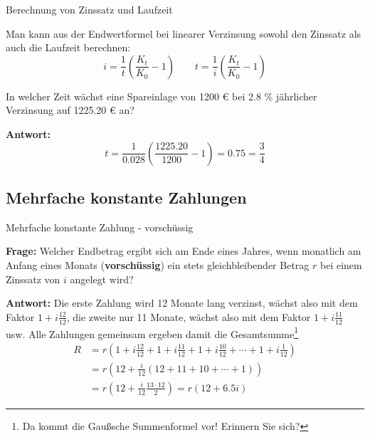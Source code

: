 \begin{frame}{Berechnung von Zinssatz und Laufzeit}
	\begin{bemerkung}
		Man kann aus der Endwertformel bei linearer Verzinsung sowohl den Zinssatz als auch die Laufzeit berechnen:
		\[
		i = \frac{1}{t} \left( \frac{K_{t}}{K_{0}} - 1\right) \qquad t = \frac{1}{i} \left( \frac{K_{t}}{K_{0}} - 1\right)
		\]
	\end{bemerkung}
	\begin{example}
		In welcher Zeit wächst eine Spareinlage von 1200 € bei 2.8 \% jährlicher Verzinsung auf 1225.20 € an?
		
		\textbf{Antwort: } 
		\[
		t = \frac{1}{0.028} \left( \frac{1225.20}{1200} - 1 \right) = 0.75 = \frac{3}{4}
		\]
	\end{example}
\end{frame}

\subsection{Mehrfache konstante Zahlungen}

\begin{frame}{Mehrfache konstante Zahlung - vorschüssig}
	\begin{example}
	\textbf{Frage: }Welcher Endbetrag ergibt sich am Ende eines Jahres, wenn monatlich am Anfang eines Monats (\textbf{vorschüssig}) ein stets gleichbleibender Betrag $r$ bei einem Zinssatz von $i$ angelegt wird?
	
	\textbf{Antwort:} Die erste Zahlung wird 12 Monate lang verzinst, wächst also mit dem Faktor $1+i\frac{12}{12}$, die zweite nur 11 Monate, wächst also mit dem Faktor $1+i\frac{11}{12}$ usw. Alle Zahlungen gemeinsam ergeben damit die Gesamtsumme\footnote{Da kommt die Gaußsche Summenformel vor! Erinnern Sie sich?} 
	\begin{align*}
		R & = r \left( 1 + i \frac{12}{12} + 1 + i \frac{11}{12} + 1 + i \frac{10}{12} +\cdots + 1 + i \frac{1}{12} \right) \\
		& = r \left( 12 + \frac{i}{12} \left( 12 + 11 + 10 + \cdots + 1 \right) \right) \\
		& = r \left( 12 + \frac{i}{12}  \frac{13 \cdot 12}{2}\right) = r \left( 12 + 6.5 i \right)
	\end{align*}
	\end{example}	
\end{frame}

